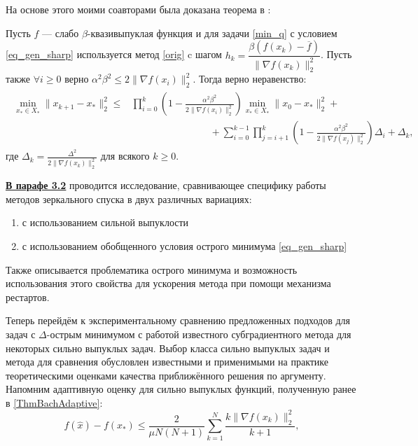 На основе этого моими соавторами была доказана теорема в \cite{sharp22}:
\begin{theorem}\label{theorem1}
Пусть $f$ --- слабо $\beta$-квазивыпуклая функция и для задачи \eqref{min_q} с условием \eqref{eq_gen_sharp} используется метод \eqref{orig} c шагом
$h_k = \dfrac{\beta(f(x_k) - \overline{f})}{\| \nabla f(x_k) \|_2^2}$. Пусть также $\forall i \geq 0$ верно $\alpha^2 \beta^2 \leq 2 \| \nabla f(x_i) \|_2^2$. Тогда верно неравенство:
\begin{gather}\label{adaptive_estimate}
    \begin{aligned}
    \min_{x_* \in X_*} \|x_{k+1} - x_* \|_2^2 \leq &  \prod_{i=0}^k \left ( 1 - \frac{\alpha^2\beta^2}{2 \| \nabla f(x_i) \|_2^2} \right ) \min_{x_* \in X_*} \|x_0 - x_* \|_2^2 + \\& 
    \qquad \qquad \qquad \qquad + \sum_{i=0}^{k-1} \prod_{j=i+1}^k \left ( 1 - \frac{\alpha^2\beta^2}{2 \| \nabla f(x_j) \|_2^2} \right )\Delta_i + \Delta_k,
    \end{aligned}
\end{gather}
где $\Delta_k = \frac{\Delta^2}{2 \| \nabla f(x_k) \|_2^2}$ для всякого $k \geqslant 0$.
\end{theorem}

\underline{\textbf{В парафе 3.2}} проводится исследование, сравнивающее специфику работы методов зеркального спуска в двух различных вариациях: 
\begin{enumerate}
    \item с использованием сильной выпуклости
    \item с использованием обобщенного условия острого минимума \eqref{eq_gen_sharp}
\end{enumerate}
Также описывается проблематика острого минимума и возможность использования этого свойства для ускорения метода при помощи механизма рестартов.

Теперь перейдём к экспериментальному сравнению предложенных подходов для задач с $\Delta$-острым минимумом с работой известного субградиентного метода \cite{Bach_2012} для некоторых сильно выпуклых задач. Выбор класса сильно выпуклых задач и метода \cite{Bach_2012} для сравнения обусловлен известными и  применимыми на практике теоретическими оценками качества приближённого решения по аргументу. Напомним адаптивную оценку для сильно выпуклых функций, полученную ранее в \ref{ThmBachAdaptive}:
\begin{equation}
    f(\widehat{x}) - f(x_*) \leq \frac{2}{\mu N (N+1)} \sum_{k=1}^{N} \frac{k \|\nabla f(x_k)\|_2^2}{k+1},
\end{equation} 

